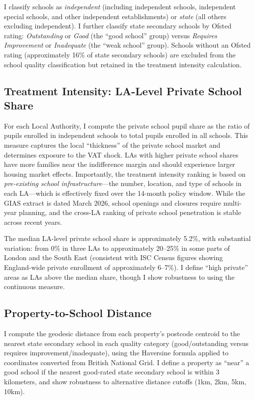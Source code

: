 \documentclass[12pt]{article}
\begin{document}
I classify schools as \textit{independent} (including independent schools, independent special schools, and other independent establishments) or \textit{state} (all others excluding independent). I further classify state secondary schools by Ofsted rating: \textit{Outstanding} or \textit{Good} (the ``good school'' group) versus \textit{Requires Improvement} or \textit{Inadequate} (the ``weak school'' group). Schools without an Ofsted rating (approximately 16\% of state secondary schools) are excluded from the school quality classification but retained in the treatment intensity calculation.

\subsection{Treatment Intensity: LA-Level Private School Share}

For each Local Authority, I compute the private school pupil share as the ratio of pupils enrolled in independent schools to total pupils enrolled in all schools. This measure captures the local ``thickness'' of the private school market and determines exposure to the VAT shock. LAs with higher private school shares have more families near the indifference margin and should experience larger housing market effects. Importantly, the treatment intensity ranking is based on \textit{pre-existing school infrastructure}---the number, location, and type of schools in each LA---which is effectively fixed over the 14-month policy window. While the GIAS extract is dated March 2026, school openings and closures require multi-year planning, and the cross-LA ranking of private school penetration is stable across recent years.

The median LA-level private school share is approximately 5.2\%, with substantial variation: from 0\% in three LAs to approximately 20--25\% in some parts of London and the South East (consistent with ISC Census figures showing England-wide private enrollment of approximately 6--7\%). I define ``high private'' areas as LAs above the median share, though I show robustness to using the continuous measure.

\subsection{Property-to-School Distance}

I compute the geodesic distance from each property's postcode centroid to the nearest state secondary school in each quality category (good/outstanding versus requires improvement/inadequate), using the Haversine formula applied to coordinates converted from British National Grid. I define a property as ``near'' a good school if the nearest good-rated state secondary school is within 3 kilometers, and show robustness to alternative distance cutoffs (1km, 2km, 5km, 10km).
\end{document}
